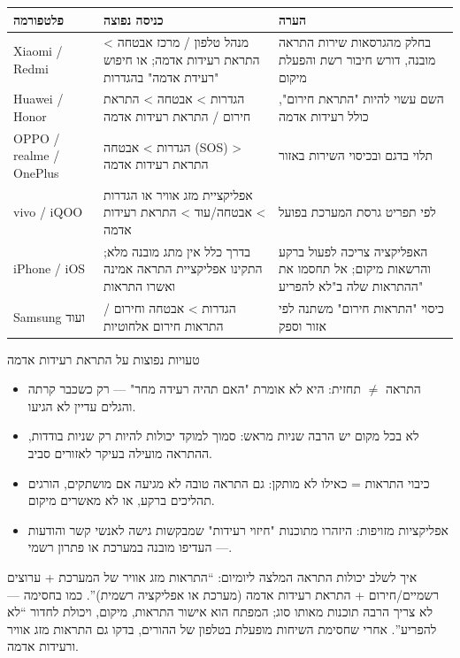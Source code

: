 \begin{center}
\begin{tabularx}{\linewidth}{|X|X|X|}
\hline
\textbf{פלטפורמה} & \textbf{כניסה נפוצה} & \textbf{הערה} \tabularnewline
\hline
Xiaomi / Redmi & מנהל טלפון / מרכז אבטחה > התראת רעידות אדמה; או חיפוש "רעידת אדמה" בהגדרות & בחלק מהגרסאות שירות התראה מובנה, דורש חיבור רשת והפעלת מיקום \tabularnewline
Huawei / Honor & הגדרות > אבטחה > התראת חירום / התראת רעידות אדמה & השם עשוי להיות "התראת חירום", כולל רעידות אדמה \tabularnewline
OPPO / realme / OnePlus & הגדרות > אבטחה (SOS) > התראת רעידות אדמה & תלוי בדגם ובכיסוי השירות באזור \tabularnewline
vivo / iQOO & אפליקציית מזג אוויר או הגדרות > אבטחה/עוד > התראת רעידות אדמה & לפי תפריט גרסת המערכת בפועל \tabularnewline
iPhone / iOS & בדרך כלל אין מתג מובנה מלא; התקינו אפליקציית התראה אמינה ואשרו התראות & האפליקציה צריכה לפעול ברקע והרשאות מיקום; אל תחסמו את ההתראות שלה ב"לא להפריע" \tabularnewline
Samsung ועוד & הגדרות > אבטחה וחירום / התראות חירום אלחוטיות & כיסוי "התראות חירום" משתנה לפי אזור וספק \tabularnewline
\hline
\end{tabularx}
\end{center}

\begin{tcbwarn}{טעויות נפוצות על התראת רעידות אדמה}
\begin{itemize}
  \item התראה $\neq$ תחזית: היא לא אומרת "האם תהיה רעידה מחר" — רק כשכבר קרתה והגלים עדיין לא הגיעו.
  \item לא בכל מקום יש הרבה שניות מראש: סמוך למוקד יכולות להיות רק שניות בודדות, ההתראה מועילה בעיקר לאזורים סביב.
  \item כיבוי התראות = כאילו לא מותקן: גם התראה טובה לא מגיעה אם מושתקים, הורגים תהליכים ברקע, או לא מאשרים מיקום.
  \item אפליקציות מזויפות: היזהרו מתוכנות "חיזוי רעידות" שמבקשות גישה לאנשי קשר והודעות — העדיפו מובנה במערכת או פתרון רשמי.
\end{itemize}

\end{tcbwarn}

\begin{tcbinfo}{איך לשלב יכולות התראה}
המלצה ליומיום: “התראות מזג אוויר של המערכת + ערוצים רשמיים/חירום + התראת רעידות אדמה (מערכת או אפליקציה רשמית)”. כמו בחסימה — לא צריך הרבה תוכנות מאותו סוג; המפתח הוא אישור התראות, מיקום, ויכולת לחדור “לא להפריע”. אחרי שחסימת השיחות מופעלת בטלפון של ההורים, בדקו גם התראות מזג אוויר ורעידות אדמה.

\end{tcbinfo}

